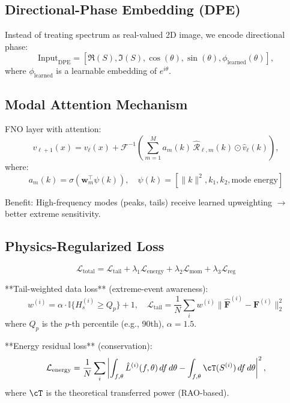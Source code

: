 \documentclass[journal,article,accept]{mdpi}
\newcommand{\cL}{\mathcal{L}}
\newcommand{\cR}{\mathcal{R}}
\newcommand{\cF}{\mathcal{F}}
\newcommand{\Hs}{H_s}
\begin{document}
\subsection{Directional-Phase Embedding (DPE)}

Instead of treating spectrum as real-valued 2D image, we encode directional phase:
\begin{equation}
\text{Input}_{\text{DPE}} = \left[ \Re(S), \Im(S), \cos(\theta), \sin(\theta), \phi_{\text{learned}}(\theta) \right],
\end{equation}
where $\phi_{\text{learned}}$ is a learnable embedding of $e^{i\theta}$.

\subsection{Modal Attention Mechanism}

FNO layer with attention:
\begin{equation}
v_{\ell+1}(x) = v_\ell(x) + \cF^{-1}\left( \sum_{m=1}^{M} a_m(k) \, \widehat{\cR}_{\ell,m}(k) \odot \widehat{v}_\ell(k) \right),
\end{equation}
where:
\begin{equation}
a_m(k) = \sigma(\mathbf{w}_m^\top \psi(k)), \quad \psi(k) = [\|k\|^2, k_1, k_2, \text{mode energy}]
\end{equation}

Benefit: High-frequency modes (peaks, tails) receive learned upweighting $\rightarrow$ better extreme sensitivity.

\subsection{Physics-Regularized Loss}

\begin{equation}
\cL_{\text{total}} = \cL_{\text{tail}} + \lambda_1 \cL_{\text{energy}} + \lambda_2 \cL_{\text{mom}} + \lambda_3 \cL_{\text{reg}}
\end{equation}

**Tail-weighted data loss** (extreme-event awareness):
\begin{equation}
w^{(i)} = \alpha \cdot \mathbb{I}\{\Hs^{(i)} \geq Q_p\} + 1, \quad \cL_{\text{tail}} = \frac{1}{N}\sum_i w^{(i)} \|\hat{\mathbf{F}}^{(i)} - \mathbf{F}^{(i)}\|_2^2
\end{equation}
where $Q_p$ is the $p$-th percentile (e.g., 90th), $\alpha = 1.5$.

**Energy residual loss** (conservation):
\begin{equation}
\cL_{\text{energy}} = \frac{1}{N}\sum_i \left| \int_{f,\theta} \hat{L}^{(i)}(f,\theta)\,df\,d\theta - \int_{f,\theta} \cT(S^{(i)})\,df\,d\theta \right|^2,
\end{equation}
where $\cT$ is the theoretical transferred power (RAO-based).
\end{document}
